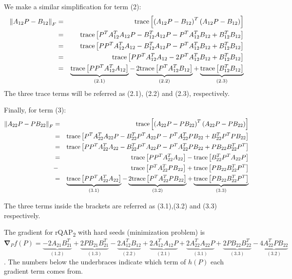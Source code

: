 \documentclass[12pt,oneside,final]{thesis}\usepackage[]{graphicx}\usepackage[]{color}
\begin{document}
We make a similar simplification for term (2):
\begin{align*}
\left\Vert A_{12}P-B_{12}\right\Vert _{F} & = & \textup{trace}\left[\left(A_{12}P-B_{12}\right)^{T}\left(A_{12}P-B_{12}\right)\right]\\
 & = & \textup{trace}\left[ P^{T}A_{12}^{T}A_{12}P-B_{12}^{T}A_{12}P-P^{T}A_{12}^{T}B_{12}+B_{12}^{T}B_{12}\right]\\
 & = & \textup{trace}\left[ PP^{T}A_{12}^{T}A_{12}-B_{12}^{T}A_{12}P-P^{T}A_{12}^{T}B_{12}+B_{12}^{T}B_{12}\right]\\
 & = & \textup{trace}\left[ PP^{T}A_{12}^{T}A_{12}-2P^{T}A_{12}^{T}B_{12}+B_{12}^{T}B_{12}\right] \\
 & =  & \underbrace{\textup{trace}\left[ PP^{T}A_{12}^{T}A_{12}\right]}_{(2.1)}
 -\underbrace{2 \textup{trace} \left[P^{T}A_{12}^{T}B_{12}\right]}_{(2.2)}
 +\underbrace{\textup{trace} \left[B_{12}^{T}B_{12}\right]}_{(2.3)}
\end{align*}
The three trace terms will be referred as (2.1), (2.2) and
(2.3), respectively.

Finally, for term (3):
\begin{align*}
\left\Vert A_{22}P-PB_{22}\right\Vert _{F} &=&\textup{trace}\left[\left(A_{22}P-PB_{22}\right)^{T}\left(A_{22}P-PB_{22}\right)\right]\\
 &=&\textup{trace}\left[P^{T}A_{22}^{T}A_{22}P-B_{22}^{T}P^{T}A_{22}P-P^{T}A_{22}^{T}PB_{22}+B_{22}^{T}P^{T}PB_{22}\right]\\
 &=&\textup{trace}\left[PP^{T}A_{22}^{T}A_{22}-B_{22}^{T}P^{T}A_{22}P-P^{T}A_{22}^{T}PB_{22}+PB_{22}B_{22}^{T}P^{T}\right]\\
  &=& {\textup{trace}\left[PP^{T}A_{22}^{T}A_{22}\right]}
 - {\textup{trace}\left[ B_{22}^{T}P^{T}A_{22}P\right]}\\
 &-&{\textup{trace}\left[P^{T}A_{22}^{T}PB_{22}\right]}
 +{\textup{trace}\left[ PB_{22}B_{22}^{T}P^{T}\right]}\\
 &=&\underbrace{\textup{trace}\left[PP^{T}A_{22}^{T}A_{22}\right]}_{(3.1)}
 -\underbrace{2\textup{trace}\left[P^{T}A_{22}^{T}PB_{22}\right]}_{(3.2)}
 +\underbrace{\textup{trace}\left[ PB_{22}B_{22}^{T}P^{T}\right]}_{(3.3)}
\end{align*}

The three terms inside the brackets are referred as (3.1),(3.2)  and (3.3)
  respectively.



The gradient for rQAP\textsubscript{2} with hard seeds (minimization problem) is
$\boldsymbol{\nabla}_{P}f(P)=
\underbrace{-2A_{21}B_{21}^{T}}_{(1.2)}
+\underbrace{2PB_{21}B_{21}^{T}}_{(1.3)}
-\underbrace{2A_{12}^{T}B_{12}}_{(2.2)}
+\underbrace{2A_{12}^{T}A_{12}P}_{(2.1)}
+\underbrace{2A_{22}^{T}A_{22}P}_{(3.1)}
+\underbrace{2PB_{22}B_{22}^{T}}_{(3.3)}
-\underbrace{4A_{22}^{T}PB_{22}}_{(3.2)}$. The numbers below the underbraces indicate which term  of $h(P)$ each gradient term comes from.
\end{document}
